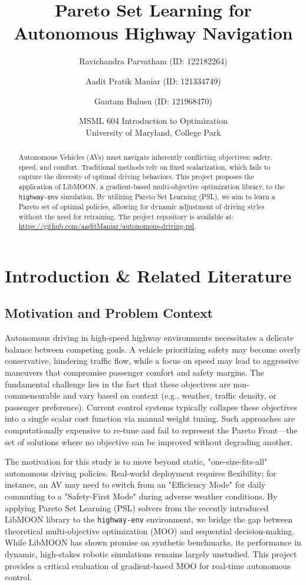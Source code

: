 \documentclass[12pt, letterpaper]{article}
\title{Pareto Set Learning for Autonomous Highway Navigation}
\author{
  Ravichandra Parvatham (ID: 122182264) \and
  Aadit Pratik Maniar (ID: 121334749) \and
  Gautam Bulusu (ID: 121968470)
}
\date{
  MSML 604 Introduction to Optimization\\
  University of Maryland, College Park
}
\begin{document}
\maketitle

\begin{abstract}
Autonomous Vehicles (AVs) must navigate inherently conflicting objectives: safety, speed, and comfort. Traditional methods rely on fixed scalarization, which fails to capture the diversity of optimal driving behaviors. This project proposes the application of LibMOON, a gradient-based multi-objective optimization library, to the \texttt{highway-env} simulation. By utilizing Pareto Set Learning (PSL), we aim to learn a Pareto set of optimal policies, allowing for dynamic adjustment of driving styles without the need for retraining. The project repository is available at: \url{https://github.com/aaditManiar/autonomous-driving-psl}.
\end{abstract}

\section{Introduction \& Related Literature}

\subsection{Motivation and Problem Context}
Autonomous driving in high-speed highway environments necessitates a delicate balance between competing goals. A vehicle prioritizing safety may become overly conservative, hindering traffic flow, while a focus on speed may lead to aggressive maneuvers that compromise passenger comfort and safety margins. The fundamental challenge lies in the fact that these objectives are non-commensurable and vary based on context (e.g., weather, traffic density, or passenger preference). Current control systems typically collapse these objectives into a single scalar cost function via manual weight tuning. Such approaches are computationally expensive to re-tune and fail to represent the Pareto Front—the set of solutions where no objective can be improved without degrading another.

The motivation for this study is to move beyond static, "one-size-fits-all" autonomous driving policies. Real-world deployment requires flexibility; for instance, an AV may need to switch from an "Efficiency Mode" for daily commuting to a "Safety-First Mode" during adverse weather conditions. By applying Pareto Set Learning (PSL) solvers from the recently introduced LibMOON library to the \texttt{highway-env} environment, we bridge the gap between theoretical multi-objective optimization (MOO) and sequential decision-making. While LibMOON has shown promise on synthetic benchmarks, its performance in dynamic, high-stakes robotic simulations remains largely unstudied. This project provides a critical evaluation of gradient-based MOO for real-time autonomous control.
\end{document}
